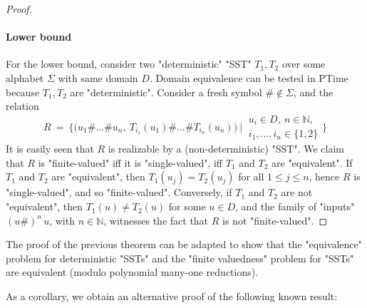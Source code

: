 \documentclass{theoretics}
\newcommand{\RestateGo}[1]{\renewcommand{#1}{(Restated)}}
\newcommand{\alp}{\Sigma}
\begin{document}
\begin{proof}
    
    \paragraph{Lower bound} For the lower bound, consider two "deterministic" "SST" $T_1,T_2$ over
    some alphabet $\alp$ with same domain $D$. Domain equivalence can be
    tested in {\upshape\sc PTime} because $T_1,T_2$ are "deterministic". 
    Consider a fresh symbol $\#\not\in\Sigma$,
    and the relation
    \[
    R ~=~ \Big\{ \big(u_1 \# \dots \# u_n, \: T_{i_1}(u_1) \# \dots \# T_{i_n}(u_n)\big) 
                 ~\Big|~
                 \begin{smallmatrix}
                 u_i\in D, ~
                 n\in\mathbb{N}, \\
                 i_1,\dots,i_n\in\{1,2\} 
                 \end{smallmatrix} 
          \Big\}
    \]
    It is easily seen that $R$ is realizable 
    by a (non-deterministic) "SST". 
    We claim that $R$ is "finite-valued" iff it is "single-valued", iff
    $T_1$ and $T_2$ are "equivalent". 
    If $T_1$ and $T_2$ are "equivalent",
    then $T_1(u_j) = T_2(u_j)$ for all $1\leq j\leq n$, hence $R$ is
    "single-valued", and so "finite-valued". 
    Conversely, if $T_1$ and $T_2$ are not "equivalent", then 
    $T_1(u)\neq T_2(u)$ for some $u\in D$, and the family of "inputs" 
    $(u\#)^n \, u$, with $n\in\mathbb{N}$, witnesses the fact that
    $R$ is not "finite-valued". 
\end{proof}

\begin{remark}
    The proof of the previous theorem can be adapted to show that the "equivalence" problem for deterministic "SSTs" and the "finite valuedness" problem for "SSTs" are equivalent (modulo polynomial many-one reductions).
\end{remark}

As a corollary, we obtain an alternative proof of the following 
known result:

\RestateGo{\restateYen}
\Yen*
\end{document}
